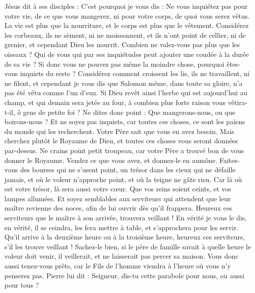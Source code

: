 \begin{multicols}{2}
{
Jésus dit à ses disciples : C’est pourquoi je vous dis : Ne vous inquiétez pas pour votre vie, de ce que vous mangerez, ni pour votre corps, de quoi vous serez vêtus.
La vie est plus que la nourriture, et le corps est plus que le vêtement.
Considérez les corbeaux, ils ne sèment, ni ne moissonnent, et ils n'ont point de cellier, ni de grenier, et cependant Dieu les nourrit. Combien ne valez-vous pas plus que les oiseaux ?
Qui de vous qui par ses inquiétudes peut ajouter une coudée à la durée de sa vie ?
Si donc vous ne pouvez pas même la moindre chose, pourquoi êtes-vous inquiets du reste ?
Considérez comment croissent les lis, ils ne travaillent, ni ne filent, et cependant je vous dis que Salomon même, dans toute sa gloire, n’a pas été vêtu comme l'un d'eux.
Si Dieu revêt ainsi l'herbe qui est aujourd'hui au champ, et qui demain sera jetée au four, à combien plus forte raison vous vêtira-t-il, ô gens de petite foi ?
Ne dites donc point : Que mangerons-nous, ou que boirons-nous ? Et ne soyez pas inquiets,
car toutes ces choses, ce sont les païens du monde qui les recherchent. Votre Père sait que vous en avez besoin.
Mais cherchez plutôt le Royaume de Dieu, et toutes ces choses vous seront données par-dessus.
Ne crains point petit troupeau, car votre Père a trouvé bon de vous donner le Royaume.
Vendez ce que vous avez, et donnez-le en aumône. Faites-vous des bourses qui ne s’usent point, un trésor dans les cieux qui ne défaille jamais, et où le voleur n'approche point, et où la teigne ne gâte rien.
Car là où est votre trésor, là sera aussi votre cœur.
Que vos reins soient ceints, et vos lampes allumées.
Et soyez semblables aux serviteurs qui attendent que leur maître revienne des noces, afin de lui ouvrir dès qu’il frappera.
Heureux ces serviteurs que le maître à son arrivée, trouvera veillant ! En vérité je vous le dis, en vérité, il se ceindra, les fera mettre à table, et s’approchera pour les servir.
Qu’il arrive à la deuxième heure ou à la troisième heure, heureux ces serviteurs, s’il les trouve veillant !
Sachez-le bien, si le père de famille savait à quelle heure le voleur doit venir, il veillerait, et ne laisserait pas percer sa maison.
Vous donc aussi tenez-vous prêts, car le Fils de l'homme viendra à l'heure où vous n'y penserez pas.
Pierre lui dit : Seigneur, dis-tu cette parabole pour nous, ou aussi pour tous ?
}
\end{multicols}
